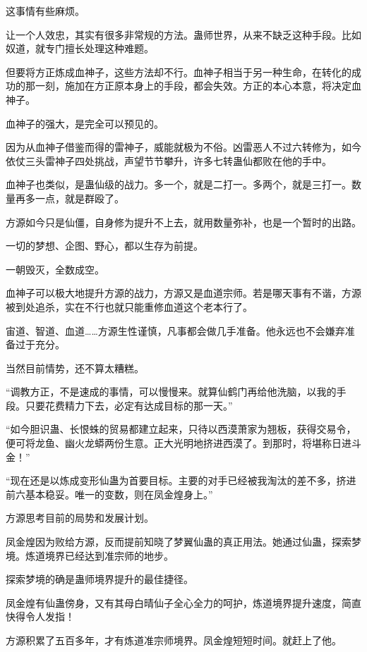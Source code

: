 
\begin{this_body}

这事情有些麻烦。

让一个人效忠，其实有很多非常规的方法。蛊师世界，从来不缺乏这种手段。比如奴道，就专门擅长处理这种难题。

但要将方正炼成血神子，这些方法却不行。血神子相当于另一种生命，在转化的成功的那一刻，施加在方正原本身上的手段，都会失效。方正的本心本意，将决定血神子。

血神子的强大，是完全可以预见的。

因为从血神子借鉴而得的雷神子，威能就极为不俗。凶雷恶人不过六转修为，如今依仗三头雷神子四处挑战，声望节节攀升，许多七转蛊仙都败在他的手中。

血神子也类似，是蛊仙级的战力。多一个，就是二打一。多两个，就是三打一。数量再多一点，就是群殴了。

方源如今只是仙僵，自身修为提升不上去，就用数量弥补，也是一个暂时的出路。

一切的梦想、企图、野心，都以生存为前提。

一朝毁灭，全数成空。

血神子可以极大地提升方源的战力，方源又是血道宗师。若是哪天事有不谐，方源被到处追杀，实在不行也就只能重修血道这个老本行了。

宙道、智道、血道……方源生性谨慎，凡事都会做几手准备。他永远也不会嫌弃准备过于充分。

当然目前情势，还不算太糟糕。

“调教方正，不是速成的事情，可以慢慢来。就算仙鹤门再给他洗脑，以我的手段。只要花费精力下去，必定有达成目标的那一天。”

“如今胆识蛊、长恨蛛的贸易都建立起来，只待以西漠萧家为翘板，获得交易令，便可将龙鱼、幽火龙蟒两份生意。正大光明地挤进西漠了。到那时，将堪称日进斗金！”

“现在还是以炼成变形仙蛊为首要目标。主要的对手已经被我淘汰的差不多，挤进前六基本稳妥。唯一的变数，则在凤金煌身上。”

方源思考目前的局势和发展计划。

凤金煌因为败给方源，反而提前知晓了梦翼仙蛊的真正用法。她通过仙蛊，探索梦境。炼道境界已经达到准宗师的地步。

探索梦境的确是蛊师境界提升的最佳捷径。

凤金煌有仙蛊傍身，又有其母白晴仙子全心全力的呵护，炼道境界提升速度，简直快得令人发指！

方源积累了五百多年，才有炼道准宗师境界。凤金煌短短时间。就赶上了他。


\end{this_body}
